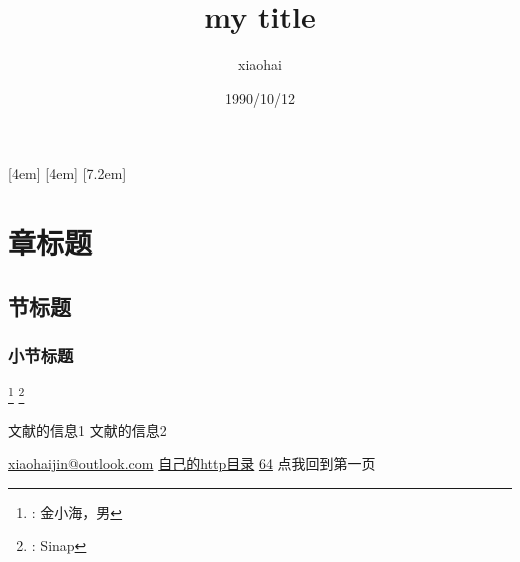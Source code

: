 \documentclass[11pt,UTF8,hyperref,openany]{ctexbook}
\author{xiaohai}
\date{1990/10/12}
\title{my title}
\begin{document}

\maketitle

[4em]{\addvspace{2.3mm}\bf}{%
  \contentslabel{4.0em}}{}{\titlerule*[5pt]{$\cdot$}\contentspage}
[4em]{}{\contentslabel{2.5em}}{}{%
  \titlerule*[5pt]{$\cdot$}\contentspage}
[7.2em]{}{\contentslabel{3.3em}}{}{%
  \titlerule*[5pt]{$\cdot$}\contentspage}
\tableofcontents

\chapter{章标题}
\section{节标题}
\subsection{小节标题}

\renewcommand{\thefootnote}{}
\footnote{: 金小海，男}
\footnote{: Sinap}
\setcounter{footnote}{0}
\renewcommand{\thefootnote}{\arabic{footnote}}





\appendix

\begin{thebibliography}{99}
文献的信息1
文献的信息2
\end{thebibliography}

\noindent\url{xiaohaijin@outlook.com}\newline
\href{http://192.168.1.119/self/index.html}{自己的http目录}\newline
\href{http://10.10.11.64}{64}\newline
点我回到第一页
\end{document}
